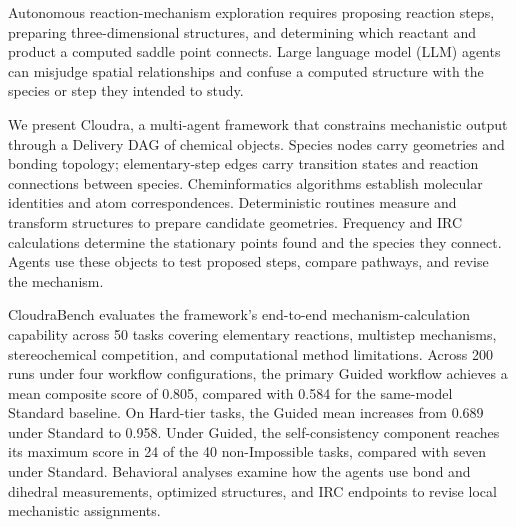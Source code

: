 Autonomous reaction-mechanism exploration requires proposing reaction steps, preparing three-dimensional structures, and determining which reactant and product a computed saddle point connects. Large language model (LLM) agents can misjudge spatial relationships and confuse a computed structure with the species or step they intended to study.

We present Cloudra, a multi-agent framework that constrains mechanistic output through a Delivery DAG of chemical objects. Species nodes carry geometries and bonding topology; elementary-step edges carry transition states and reaction connections between species. Cheminformatics algorithms establish molecular identities and atom correspondences. Deterministic routines measure and transform structures to prepare candidate geometries. Frequency and IRC calculations determine the stationary points found and the species they connect. Agents use these objects to test proposed steps, compare pathways, and revise the mechanism.

CloudraBench evaluates the framework's end-to-end mechanism-calculation capability across 50 tasks covering elementary reactions, multistep mechanisms, stereochemical competition, and computational method limitations. Across 200 runs under four workflow configurations, the primary Guided workflow achieves a mean composite score of 0.805, compared with 0.584 for the same-model Standard baseline. On Hard-tier tasks, the Guided mean increases from 0.689 under Standard to 0.958. Under Guided, the self-consistency component reaches its maximum score in 24 of the 40 non-Impossible tasks, compared with seven under Standard. Behavioral analyses examine how the agents use bond and dihedral measurements, optimized structures, and IRC endpoints to revise local mechanistic assignments.
